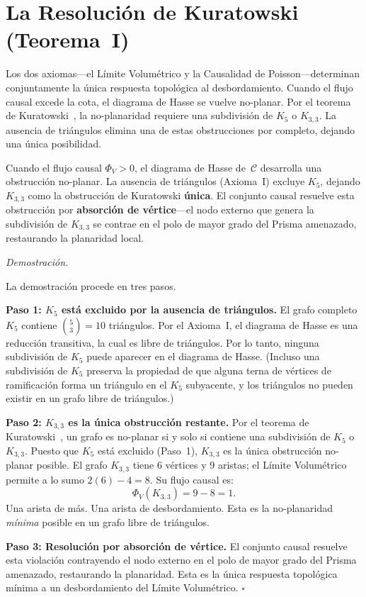 \documentclass[11pt, a4paper, openany]{book}
\renewenvironment{proof}[1][Demostraci\'on]{%
  \par\noindent\textit{#1.}\quad
}{\hfill$\square$\par\medskip}
\begin{document}
\section{La Resoluci\'on de Kuratowski (Teorema~I)}
\label{sec:kuratowski-resolution}

Los dos axiomas---el L\'imite Volum\'etrico y la Causalidad de
Poisson---determinan conjuntamente la \'unica respuesta topol\'ogica al
desbordamiento. Cuando el flujo causal excede la cota, el diagrama de
Hasse se vuelve no-planar. Por el teorema de
Kuratowski~\cite{kuratowski1930}, la no-planaridad requiere una
subdivisi\'on de $K_5$ o $K_{3,3}$. La ausencia de tri\'angulos elimina
una de estas obstrucciones por completo, dejando una \'unica
posibilidad.

\begin{theorem}
\label{ax:planarity-preservation}
Cuando el flujo causal $\Phi_V > 0$, el diagrama de Hasse
de~$\mathcal{C}$ desarrolla una obstrucci\'on no-planar. La ausencia de
tri\'angulos (Axioma~I) excluye $K_5$, dejando $K_{3,3}$ como la
obstrucci\'on de Kuratowski \textbf{\'unica}. El conjunto causal
resuelve esta obstrucci\'on por \textbf{absorci\'on de v\'ertice}---el
nodo externo que genera la subdivisi\'on de $K_{3,3}$ se contrae en el
polo de mayor grado del Prisma amenazado, restaurando la planaridad
local.
\end{theorem}

\begin{proof}
La demostraci\'on procede en tres pasos.

\medskip\noindent
\textbf{Paso 1: $K_5$ est\'a excluido por la ausencia de tri\'angulos.}
El grafo completo $K_5$ contiene $\binom{5}{3} = 10$ tri\'angulos.
Por el Axioma~I, el diagrama de Hasse es una reducci\'on transitiva, la
cual es libre de tri\'angulos. Por lo tanto, ninguna subdivisi\'on de
$K_5$ puede aparecer en el diagrama de Hasse. (Incluso una subdivisi\'on
de $K_5$ preserva la propiedad de que alguna terna de v\'ertices de
ramificaci\'on forma un tri\'angulo en el $K_5$ subyacente, y los
tri\'angulos no pueden existir en un grafo libre de tri\'angulos.)

\medskip\noindent
\textbf{Paso 2: $K_{3,3}$ es la \'unica obstrucci\'on restante.}
Por el teorema de Kuratowski~\cite{kuratowski1930}, un grafo es
no-planar si y solo si contiene una subdivisi\'on de $K_5$ o $K_{3,3}$.
Puesto que $K_5$ est\'a excluido (Paso~1), $K_{3,3}$ es la \'unica
obstrucci\'on no-planar posible. El grafo $K_{3,3}$ tiene 6 v\'ertices
y 9 aristas; el L\'imite Volum\'etrico permite a lo sumo
$2(6) - 4 = 8$. Su flujo causal es:
\[
  \Phi_V(K_{3,3}) = 9 - 8 = 1.
\]
Una arista de m\'as. Una arista de desbordamiento. Esta es la
no-planaridad \emph{m\'inima} posible en un grafo libre de tri\'angulos.

\medskip\noindent
\textbf{Paso 3: Resoluci\'on por absorci\'on de v\'ertice.}
El conjunto causal resuelve esta violaci\'on contrayendo el nodo externo
en el polo de mayor grado del Prisma amenazado, restaurando la
planaridad. Esta es la \'unica respuesta topol\'ogica m\'inima a un
desbordamiento del L\'imite Volum\'etrico.
\end{proof}
\end{document}

